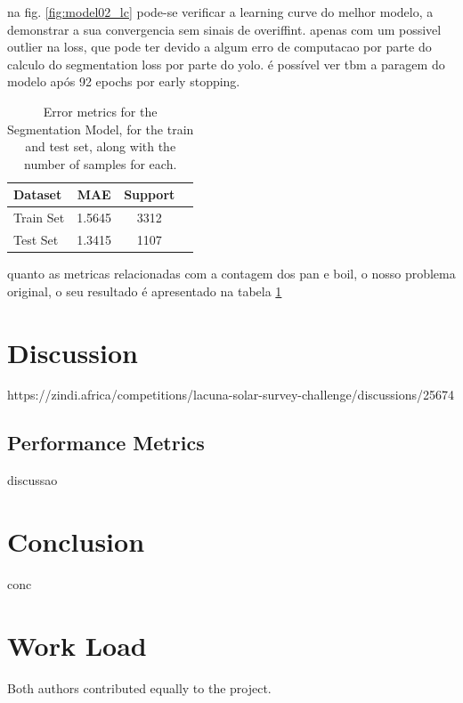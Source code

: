 \documentclass[conference]{IEEEtran}
\begin{document}
na fig. \ref{fig:model02_lc} pode-se verificar a learning curve do melhor modelo, a demonstrar a sua convergencia sem sinais de overiffint. apenas com um possivel outlier na loss, que pode ter devido a algum erro de computacao por parte do calculo do segmentation loss por parte do yolo. é possível ver tbm a paragem do modelo após 92 epochs por early stopping.

\begin{table}[H]
\centering
\caption{Error metrics for the Segmentation Model, for the train and test set, along with the number of samples for each.}
\label{tab:model02_results}
\begin{tabular}{lccc}
\toprule
\textbf{Dataset} & \textbf{MAE} & \textbf{Support} \\
\midrule
Train Set & 1.5645 & 3312 \\
Test Set & 1.3415 & 1107 \\
\bottomrule
\end{tabular}
\end{table}

quanto as metricas relacionadas com a contagem dos pan e boil, o nosso problema original, o seu resultado é apresentado na tabela \ref{tab:model02_results}


\section{Discussion} 

https://zindi.africa/competitions/lacuna-solar-survey-challenge/discussions/25674

\subsection{Performance Metrics}

discussao


\section{Conclusion}

conc


\section*{Work Load}

Both authors contributed equally to the project.



\end{document}

